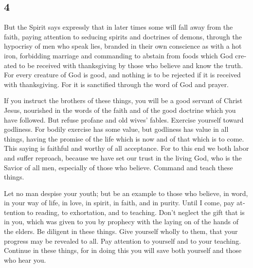 \begin{paracol}{2}
\switchcolumn
\begin{otherlanguage}{english}

\hypertarget{section-7}{%
\section{4}\label{section-7}}

 But the Spirit says expressly that in later times some
will fall away from the faith, paying attention to seducing spirits and
doctrines of demons,  through the hypocrisy of men who
speak lies, branded in their own conscience as with a hot iron,
 forbidding marriage and commanding to abstain from foods
which God created to be received with thanksgiving by those who believe
and know the truth.  For every creature of God is good,
and nothing is to be rejected if it is received with thanksgiving.
 For it is sanctified through the word of God and prayer.

 If you instruct the brothers of these things, you will be
a good servant of Christ Jesus, nourished in the words of the faith and
of the good doctrine which you have followed.  But refuse
profane and old wives' fables. Exercise yourself toward godliness.
 For bodily exercise has some value, but godliness has
value in all things, having the promise of the life which is now and of
that which is to come.  This saying is faithful and worthy
of all acceptance.  For to this end we both labor and
suffer reproach, because we have set our trust in the living God, who is
the Savior of all men, especially of those who believe. 
Command and teach these things.

 Let no man despise your youth; but be an example to
those who believe, in word, in your way of life, in love, in spirit, in
faith, and in purity.  Until I come, pay attention to
reading, to exhortation, and to teaching.  Don't neglect
the gift that is in you, which was given to you by prophecy with the
laying on of the hands of the elders.  Be diligent in
these things. Give yourself wholly to them, that your progress may be
revealed to all.  Pay attention to yourself and to your
teaching. Continue in these things, for in doing this you will save both
yourself and those who hear you.

\end{otherlanguage}


\end{paracol}
